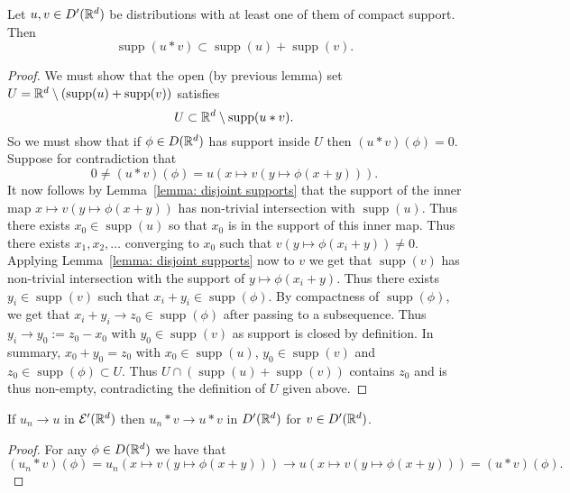 \documentclass[twoside, a4paper, 10pt]{amsart}
\begin{document}
\begin{prop}\label{prop: support convolution sumset} Let $u,v \in D'(\mathbb{R}^d)$ be distributions with at least one of them of compact support. Then $$\operatorname{supp}(u * v) \subset \operatorname{supp}(u) + \operatorname{supp}(v).$$

\end{prop}

\begin{proof} We must show that the open (by previous lemma) set $U = \mathbb{R}^d \setminus (\operatorname{supp}(u) + \operatorname{supp}(v))$ satisfies $$U \subset \mathbb{R}^d \setminus \operatorname{supp}(u *v).$$ So we must show that if  $\phi \in D(\mathbb{R}^d)$ has support inside $U$ then $(u*v)(\phi) = 0$. Suppose for contradiction that $$0 \neq (u * v) (\phi) = u(x \mapsto v(y \mapsto \phi(x+y))).$$ 
It now follows by Lemma~\ref{lemma: disjoint supports} that the support of the inner map $x \mapsto v(y \mapsto \phi(x+y))$ has non-trivial intersection with $\operatorname{supp}(u)$. Thus there exists $x_0 \in \operatorname{supp}(u)$ so that $x_0$ is in the support of this inner map. Thus there exists $x_1,x_2, \ldots $ converging to $x_0$ such that $v(y \mapsto \phi(x_i+y)) \neq 0$. Applying Lemma~\ref{lemma: disjoint supports} now to $v$ we get that $\operatorname{supp}(v)$ has non-trivial intersection with the support of $y \mapsto \phi(x_i+y)$. Thus there exists $y_i \in \operatorname{supp}(v)$ such that $x_i + y_i \in \operatorname{supp}(\phi)$. By compactness of $\operatorname{supp}(\phi)$, we get that $x_i + y_i \to z_0 \in \operatorname{supp}(\phi)$ after passing to a subsequence. Thus $y_i \to y_0 := z_0 - x_0$ with $y_0 \in \operatorname{supp}(v)$ as support is closed by definition. In summary, $x_0 + y_0 = z _0$ with $x_0 \in \operatorname{supp}(u)$, $y_0 \in \operatorname{supp}(v)$ and $z_0 \in \operatorname{supp}(\phi) \subset U$. Thus $U \cap (\operatorname{supp}(u) + \operatorname{supp}(v))$ contains $z_0$ and is thus non-empty, contradicting the definition of $U$ given above.  \end{proof}


\begin{lemma}\label{lemma: convolution continuous} If $u_n \to u$ in $\mathcal{E}'(\mathbb{R}^d)$ then $u_n * v \to u * v$ in $D'(\mathbb{R}^d)$ for $v \in D'(\mathbb{R}^d)$.

\end{lemma}

\begin{proof} For any $\phi \in D(\mathbb{R}^d)$ we have that $$(u_n * v)(\phi) = u_n(x \mapsto v(y \mapsto \phi(x+y))) \to u(x \mapsto v(y \mapsto \phi(x+y))) = (u*v)(\phi).$$

\end{proof}
\end{document}
